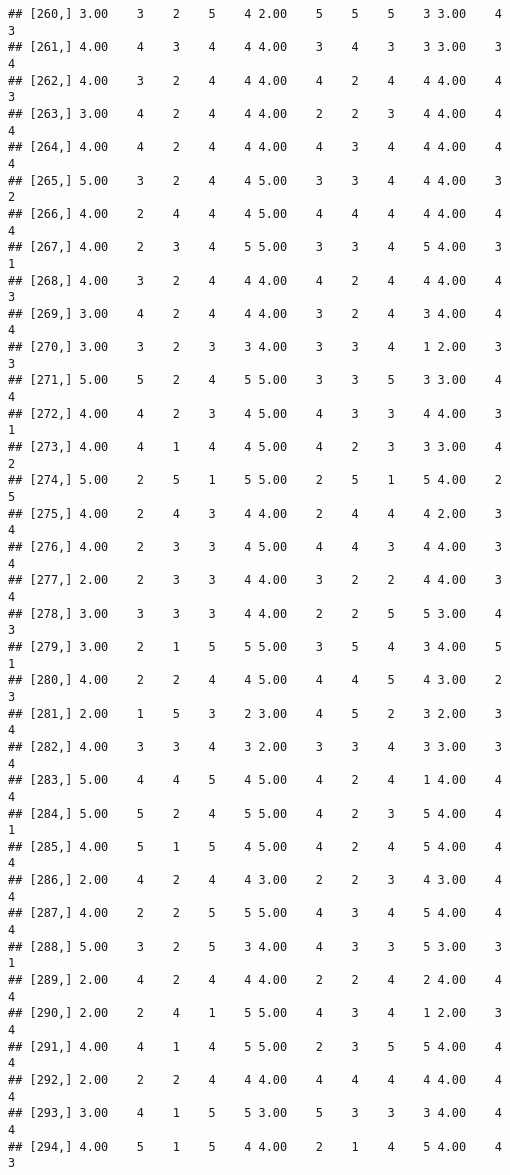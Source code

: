 \documentclass[]{article}
\begin{document}
\begin{verbatim}
## [260,] 3.00    3    2    5    4 2.00    5    5    5    3 3.00    4    3
## [261,] 4.00    4    3    4    4 4.00    3    4    3    3 3.00    3    4
## [262,] 4.00    3    2    4    4 4.00    4    2    4    4 4.00    4    3
## [263,] 3.00    4    2    4    4 4.00    2    2    3    4 4.00    4    4
## [264,] 4.00    4    2    4    4 4.00    4    3    4    4 4.00    4    4
## [265,] 5.00    3    2    4    4 5.00    3    3    4    4 4.00    3    2
## [266,] 4.00    2    4    4    4 5.00    4    4    4    4 4.00    4    4
## [267,] 4.00    2    3    4    5 5.00    3    3    4    5 4.00    3    1
## [268,] 4.00    3    2    4    4 4.00    4    2    4    4 4.00    4    3
## [269,] 3.00    4    2    4    4 4.00    3    2    4    3 4.00    4    4
## [270,] 3.00    3    2    3    3 4.00    3    3    4    1 2.00    3    3
## [271,] 5.00    5    2    4    5 5.00    3    3    5    3 3.00    4    4
## [272,] 4.00    4    2    3    4 5.00    4    3    3    4 4.00    3    1
## [273,] 4.00    4    1    4    4 5.00    4    2    3    3 3.00    4    2
## [274,] 5.00    2    5    1    5 5.00    2    5    1    5 4.00    2    5
## [275,] 4.00    2    4    3    4 4.00    2    4    4    4 2.00    3    4
## [276,] 4.00    2    3    3    4 5.00    4    4    3    4 4.00    3    4
## [277,] 2.00    2    3    3    4 4.00    3    2    2    4 4.00    3    4
## [278,] 3.00    3    3    3    4 4.00    2    2    5    5 3.00    4    3
## [279,] 3.00    2    1    5    5 5.00    3    5    4    3 4.00    5    1
## [280,] 4.00    2    2    4    4 5.00    4    4    5    4 3.00    2    3
## [281,] 2.00    1    5    3    2 3.00    4    5    2    3 2.00    3    4
## [282,] 4.00    3    3    4    3 2.00    3    3    4    3 3.00    3    4
## [283,] 5.00    4    4    5    4 5.00    4    2    4    1 4.00    4    4
## [284,] 5.00    5    2    4    5 5.00    4    2    3    5 4.00    4    1
## [285,] 4.00    5    1    5    4 5.00    4    2    4    5 4.00    4    4
## [286,] 2.00    4    2    4    4 3.00    2    2    3    4 3.00    4    4
## [287,] 4.00    2    2    5    5 5.00    4    3    4    5 4.00    4    4
## [288,] 5.00    3    2    5    3 4.00    4    3    3    5 3.00    3    1
## [289,] 2.00    4    2    4    4 4.00    2    2    4    2 4.00    4    4
## [290,] 2.00    2    4    1    5 5.00    4    3    4    1 2.00    3    4
## [291,] 4.00    4    1    4    5 5.00    2    3    5    5 4.00    4    4
## [292,] 2.00    2    2    4    4 4.00    4    4    4    4 4.00    4    4
## [293,] 3.00    4    1    5    5 3.00    5    3    3    3 4.00    4    4
## [294,] 4.00    5    1    5    4 4.00    2    1    4    5 4.00    4    3

\end{verbatim}
\end{document}
